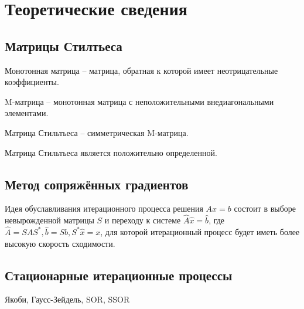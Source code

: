 \section{Теоретические сведения}

\subsection{Матрицы Стилтьеса}

Монотонная матрица – матрица, обратная к которой имеет неотрицательные коэффициенты.

M-матрица – монотонная матрица с неположительными внедиагональными элементами.

Матрица Стильтьеса – симметрическая M-матрица.

Матрица Стильтьеса является положительно определенной.

\subsection{Метод сопряжённых градиентов}

Идея обуславливания итерационного процесса решения $Ax=b$ состоит в выборе невырожденной матрицы $S$ и переходу к системе $\hat A\hat x=\hat b$, где $\hat A=SAS^\ast, \hat b=Sb, S^\ast\hat x=x$, для которой итерационный процесс будет иметь более высокую скорость сходимости.

\subsection{Стационарные итерационные процессы}
Якоби, Гаусс-Зейдель, SOR, SSOR